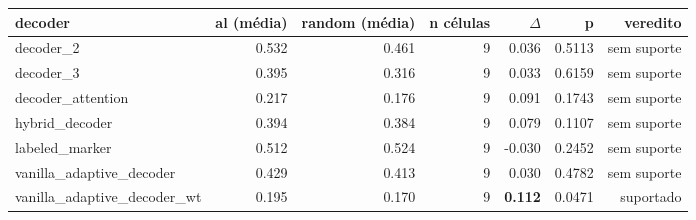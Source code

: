 \begin{tabular}{lrrrrrr}
\toprule
decoder & al (média) & random (média) & n células & $\Delta$ & p & veredito \\
\midrule
decoder\_2 & 0.532 & 0.461 & 9 & 0.036 & 0.5113 & sem suporte \\
decoder\_3 & 0.395 & 0.316 & 9 & 0.033 & 0.6159 & sem suporte \\
decoder\_attention & 0.217 & 0.176 & 9 & 0.091 & 0.1743 & sem suporte \\
hybrid\_decoder & 0.394 & 0.384 & 9 & 0.079 & 0.1107 & sem suporte \\
labeled\_marker & 0.512 & 0.524 & 9 & -0.030 & 0.2452 & sem suporte \\
vanilla\_adaptive\_decoder & 0.429 & 0.413 & 9 & 0.030 & 0.4782 & sem suporte \\
vanilla\_adaptive\_decoder\_wt & 0.195 & 0.170 & 9 & \textbf{0.112} & 0.0471 & suportado \\
\bottomrule
\end{tabular}
